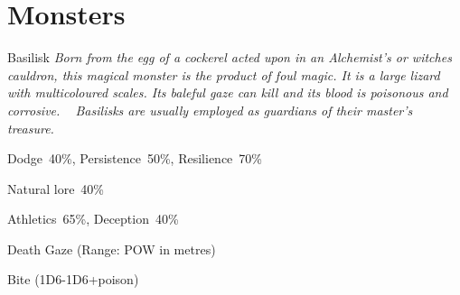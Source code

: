 \clearpage




\section{Monsters}


\begin{monsterbox}{Basilisk}
	\textit{Born from the egg of a cockerel acted upon in an Alchemist’s or witches cauldron, this magical monster is the product of foul magic. It is a large lizard with multicoloured scales. Its baleful gaze can kill and its blood is poisonous and corrosive.   Basilisks are usually employed as guardians of their master’s treasure.}\\
	\rpghline
	\basics[%
        hitpoints  = 8, %
	majorwound = 4,
	damagemodifier = -1D6,
	powerpoints = 16,
	movementrate = 15m,
	armor = Armor Scales (2AP),
	plunderrating = 5
	]
	\rpghline%
	\stats[ %
		STR = 2D3   (4),
		CON = 2D6+6 (13),
		DEX = 3D6   (11),
		SIZ = 1D3   (2),
		INT = 3     (3),
		POW = 1D6+12 (16),
		CHA = 3     (3)
	]
	\rpghline%
	\begin{rpg-monsteraction}[Resistances]
		Dodge~40\%, Persistence~50\%, Resilience~70\%
	\end{rpg-monsteraction}
	\begin{rpg-monsteraction}[Knowledge]
    		Natural lore~40\%
	\end{rpg-monsteraction}
	\begin{rpg-monsteraction}[Practical]
		Athletics~65\%, Deception~40\%
	\end{rpg-monsteraction}
	\begin{rpg-monsteraction}
		Death Gaze (Range: POW in metres)
	\end{rpg-monsteraction}
	\begin{rpg-monsteraction}
		Bite (1D6-1D6+poison)
	\end{rpg-monsteraction}
	\begin{rpg-monsteraction}\\

\end{rpg-monsteraction}
\end{monsterbox}
